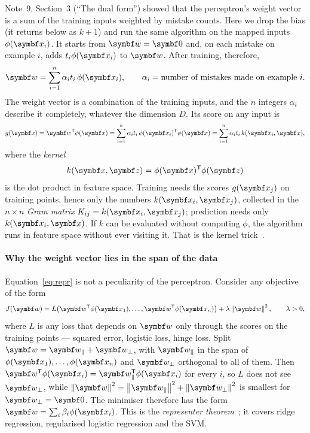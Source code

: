 \documentclass[11pt]{article}
\newcommand{\w}{\vect{w}}
\newcommand{\z}{\vect{z}}
\begin{document}
Note~9, Section~3 (``The dual form'') showed that the perceptron's weight vector is a sum of the training inputs weighted
by mistake counts. Here we drop the bias (it returns below as $k + 1$) and run the same algorithm on the mapped inputs
$\phi(\x_i)$. It starts from $\w = \vect{0}$ and, on each mistake on example $i$, adds $t_i\phi(\x_i)$ to $\w$. After
training, therefore,
\begin{equation}\label{eq:repr}
  \w = \sum_{i=1}^n \alpha_i t_i\, \phi(\x_i), \qquad \alpha_i = \text{number of mistakes made on example } i .
\end{equation}
The weight vector is a combination of the training inputs, and the $n$ integers $\alpha_i$ describe it completely,
whatever the dimension $D$. Its score on any input is
\begin{equation}\label{eq:kscore}
  g(\x) = \w\T\phi(\x) = \sum_{i=1}^n \alpha_i t_i\, \phi(\x_i)\T\phi(\x) = \sum_{i=1}^n \alpha_i t_i\, k(\x_i, \x),
\end{equation}
where the \emph{kernel}
\begin{equation}\label{eq:kernel}
  k(\x, \z) = \phi(\x)\T\phi(\z)
\end{equation}
is the dot product in feature space. Training needs the scores $g(\x_j)$ on training points, hence only the numbers
$k(\x_i, \x_j)$, collected in the $n \times n$ \emph{Gram matrix} $K_{ij} = k(\x_i, \x_j)$; prediction needs only
$k(\x_i, \x)$. If $k$ can be evaluated without computing $\phi$, the algorithm runs in feature space without ever
visiting it. That is the kernel trick~\cite{aizerman1964,boser1992}.

\paragraph{Why the weight vector lies in the span of the data} Equation~\eqref{eq:repr} is not a peculiarity of the
perceptron. Consider any objective of the form
\[
  J(\w) = L\big(\w\T\phi(\x_1), \dots, \w\T\phi(\x_n)\big) + \lambda\norm{\w}^2 , \qquad \lambda > 0,
\]
where $L$ is any loss that depends on $\w$ only through the scores on the training points --- squared error, logistic
loss, hinge loss. Split $\w = \w_\parallel + \w_\perp$, with $\w_\parallel$ in the span of
$\phi(\x_1), \dots, \phi(\x_n)$ and $\w_\perp$ orthogonal to all of them. Then $\w\T\phi(\x_i) = \w_\parallel\T\phi(\x_i)$
for every $i$, so $L$ does not see $\w_\perp$, while $\norm{\w}^2 = \norm{\w_\parallel}^2 + \norm{\w_\perp}^2$ is smallest
for $\w_\perp = \vect{0}$. The minimiser therefore has the form $\w = \sum_i \beta_i \phi(\x_i)$. This is the
\emph{representer theorem}~\cite{kimeldorf1971,scholkopf2001}; it covers ridge regression, regularised logistic regression
and the SVM.
\end{document}
